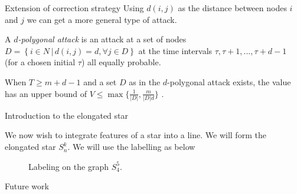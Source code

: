 \documentclass[11pt]{beamer}
\newcommand{\set}[2]{\left\{ #1 \, | \, #2 \right\}}
\begin{document}
\begin{frame}{Extension of correction strategy}
Using $d(i,j)$ as the distance between nodes $i$ and $j$ we can get a more general type of attack.

\begin{definition}
A \textit{$d$-polygonal attack} is an attack at a set of nodes $D= \set{i \in N}{ d(i,j)=d , \forall j \in D}$ at the time intervals $\tau,\tau+1,...,\tau+d-1$ (for a chosen initial $\tau$) all equally probable.
\end{definition}

\begin{lemma}
When $T \geq m+d-1$ and a set $D$ as in the $d$-polygonal attack exists, the value has an upper bound of $V \leq \max \{ \frac{1}{|D|} , \frac{m}{|D|d} \}$ .
\end{lemma}

\end{frame}

\hypertarget{Introduction to the elongated star}{}
\begin{frame}{Introduction to the elongated star}


We now wish to integrate features of a star into a line.
We will form the elongated star $S_{n}^{k}$. We will use the labelling as below

\begin{figure}
\begin{center}
\end{center}
\caption{Labeling on the graph $S_{4}^5$.}
\end{figure}

\end{frame}

\hypertarget{Future work}{}
\begin{frame}{Future work}

\end{frame}
\end{document}
